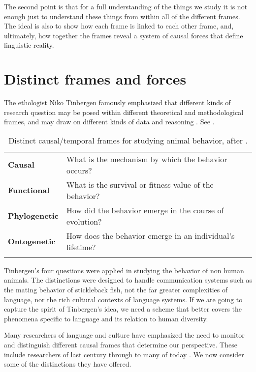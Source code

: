 The second point is that for a full understanding of the 
things we study it is not enough just to understand these 
things from within all of the different frames. The ideal is also to 
show how each frame is linked to each other frame, and, ultimately, how 
together the frames reveal a system of causal forces 
that define linguistic reality.



\section{Distinct frames and forces}
\label{Distinctframesandforces}

The ethologist Niko Tinbergen famously emphasized that different kinds of research question may be 
posed within different theoretical and methodological frames, and may 
draw on different kinds of data and reasoning \citep{tinbergen_aims_1963}. See .



\begin{table}[h]
\centering
\begin{tabular}{ll}
\lsptoprule
\textbf{Causal} & What is the mechanism by which the behavior occurs?
\\
\textbf{Functional} & What is the survival or fitness value of the 
behavior? \\
\textbf{Phylogenetic} & How did the behavior emerge in the course of 
evolution? \\
\textbf{Ontogenetic} & How does the behavior emerge in an individual's 
lifetime? \\
\lspbottomrule
\end{tabular}
\caption{Distinct causal/temporal frames for studying animal 
behavior, after \citet{tinbergen_aims_1963}.}
\label{tinbergenfour}
\end{table}



Tinbergen's four questions were applied in studying the behavior of 
non human animals. The distinctions were designed to handle 
communication systems such as the mating behavior of stickleback fish, 
not the far greater complexities of language, nor the rich cultural 
contexts of language systems. If we are going to capture the spirit of 
Tinbergen's idea, we need a scheme that better covers the phenomena 
specific to language and its relation to human diversity. 


Many researchers of language and culture have emphasized the need to monitor and distinguish different causal frames that determine our perspective. These include researchers of last century \citep{saussure_cours_1916,vygotsky_thought_1962} through 
to many of today \citep{tomasello_constructing_2003,macwhinney_emergence_2005,raczaszek-leonardi_multiple_2010,cole_phylogeny_2007,donald_slow_2007,larsen-freeman_complexity_2008,uryu_ecology_2014,lemke_across_2000,lemke_language_2002}. We now consider some of the distinctions they have offered.



